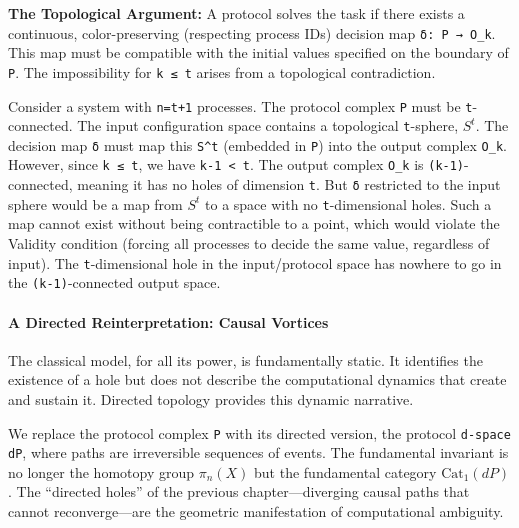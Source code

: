 \documentclass[
]{article}
\begin{document}
\textbf{The Topological Argument:} A protocol solves the task if there
exists a continuous, color-preserving (respecting process IDs) decision
map \texttt{δ:\ P\ →\ O\_k}. This map must be compatible with the
initial values specified on the boundary of \texttt{P}. The
impossibility for \texttt{k\ ≤\ t} arises from a topological
contradiction.

Consider a system with \texttt{n=t+1} processes. The protocol complex
\texttt{P} must be \texttt{t}-connected. The input configuration space
contains a topological \texttt{t}-sphere, \(S^t\). The decision map
\texttt{δ} must map this \texttt{S\^{}t} (embedded in \texttt{P}) into
the output complex \texttt{O\_k}. However, since \texttt{k\ ≤\ t}, we
have \texttt{k-1\ \textless{}\ t}. The output complex \texttt{O\_k} is
\texttt{(k-1)}-connected, meaning it has no holes of dimension
\texttt{t}. But \texttt{δ} restricted to the input sphere would be a map
from \(S^t\) to a space with no \texttt{t}-dimensional holes. Such a map
cannot exist without being contractible to a point, which would violate
the Validity condition (forcing all processes to decide the same value,
regardless of input). The \texttt{t}-dimensional hole in the
input/protocol space has nowhere to go in the \texttt{(k-1)}-connected
output space.

\paragraph{A Directed Reinterpretation: Causal
Vortices}\label{a-directed-reinterpretation-causal-vortices}

The classical model, for all its power, is fundamentally static. It
identifies the existence of a hole but does not describe the
computational dynamics that create and sustain it. Directed topology
provides this dynamic narrative.

We replace the protocol complex \texttt{P} with its directed version,
the protocol \texttt{d-space} \texttt{dP}, where paths are irreversible
sequences of events. The fundamental invariant is no longer the homotopy
group \(\pi_n(X)\) but the fundamental category \(\text{Cat}_1(dP)\).
The ``directed holes'' of the previous chapter---diverging causal paths
that cannot reconverge---are the geometric manifestation of
computational ambiguity.
\end{document}

